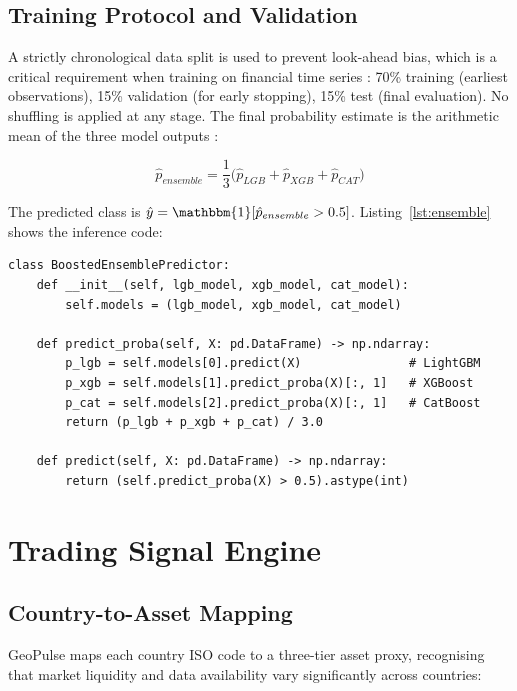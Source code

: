 \documentclass[12pt,a4paper]{report}
\begin{document}
\subsection{Training Protocol and Validation}

A strictly chronological data split is used to prevent look-ahead bias,
which is a critical requirement when training on financial time series
\cite{chen2016, ke2017}: 70\% training (earliest observations), 15\%
validation (for early stopping), 15\% test (final evaluation). No
shuffling is applied at any stage. The final probability estimate is the
arithmetic mean of the three model outputs \cite{friedman2001}:

\begin{equation}
  \hat{p}_{ensemble} = \frac{1}{3}\bigl(\hat{p}_{LGB} + \hat{p}_{XGB}
  + \hat{p}_{CAT}\bigr)
  \label{eq:ensemble}
\end{equation}

The predicted class is $\hat{y} = \mathbbm{1}[\hat{p}_{ensemble} > 0.5]$.
Listing~\ref{lst:ensemble} shows the inference code:

\begin{lstlisting}[caption={Ensemble probability averaging (simplified
  from \texttt{ml/scripts/models/run\_predict.py}).},
  label={lst:ensemble}]
class BoostedEnsemblePredictor:
    def __init__(self, lgb_model, xgb_model, cat_model):
        self.models = (lgb_model, xgb_model, cat_model)

    def predict_proba(self, X: pd.DataFrame) -> np.ndarray:
        p_lgb = self.models[0].predict(X)               # LightGBM
        p_xgb = self.models[1].predict_proba(X)[:, 1]   # XGBoost
        p_cat = self.models[2].predict_proba(X)[:, 1]   # CatBoost
        return (p_lgb + p_xgb + p_cat) / 3.0

    def predict(self, X: pd.DataFrame) -> np.ndarray:
        return (self.predict_proba(X) > 0.5).astype(int)
\end{lstlisting}

\section{Trading Signal Engine}

\subsection{Country-to-Asset Mapping}

GeoPulse maps each country ISO code to a three-tier asset proxy,
recognising that market liquidity and data availability vary significantly
across countries:
\end{document}
